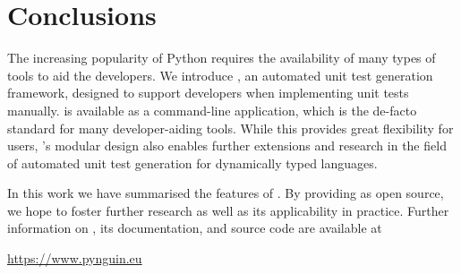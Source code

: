 \section{Conclusions}\label{sec:conclusions}

The increasing popularity of Python
requires the availability of many types of tools
to aid the developers.
%
We introduce \pynguin,
an automated unit test generation framework,
designed to support developers
when implementing unit tests manually.
%
\Pynguin is available as a command-line application,
which is the de-facto standard for many developer-aiding tools.
%
While this provides great flexibility for users,
\pynguin's modular design also enables further extensions
and research in the field of automated unit test generation
for dynamically typed languages.
%


%
In this work we have summarised the features of \pynguin.
%
By providing \pynguin as open source,
we hope to foster further research
as well as its applicability in practice.
%
Further information on \pynguin,
its documentation,
and source code
are available at
%
\begin{center}
  \url{https://www.pynguin.eu}
\end{center}


